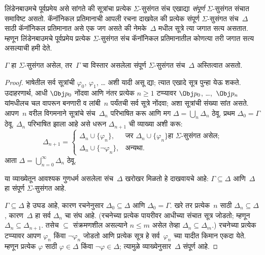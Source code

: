 लिंडेनबाउमचे पूर्वप्रमेय असे सांगते की सूत्रांचा प्रत्येक
$\Sigma$-सुसंगत संच एखाद्या \emph{संपूर्ण} $\Sigma$-सुसंगत
संचात समाविष्ट असतो. कॅनॉनिकल प्रतिमानाची आपली रचना दाखवेल की
प्रत्येक संपूर्ण $\Sigma$-सुसंगत संच~$\Delta$ साठी कॅनॉनिकल
प्रतिमानात असे एक जग असते की नेमके~$\Delta$ मधील
सूत्रे त्या जगात सत्य असतात. म्हणून लिंडेनबाउमचे पूर्वप्रमेय
प्रत्येक $\Sigma$-सुसंगत संच कॅनॉनिकल प्रतिमानातील कोणत्या तरी
जगात सत्य असल्याची हमी देते.

\begin{thm}[लिंडेनबाउमचे पूर्वप्रमेय]\label{nml:com:lin:thm:lindenbaum}
  $\Gamma$ हा $\Sigma$-सुसंगत असेल, तर~$\Gamma$ चा विस्तार असलेला
  संपूर्ण $\Sigma$-सुसंगत संच~$\Delta$ अस्तित्वात असतो.
\end{thm}

\begin{proof}
भाषेतील सर्व सूत्रांची $\varphi_0$, $\varphi_1$, \dots{} अशी यादी असू द्या;
त्यात एखादे सूत्र पुन्हा येऊ शकते. उदाहरणार्थ, आधी
$\Obj p_0$ नोंदवा आणि नंतर प्रत्येक $n \ge 1$ टप्प्यावर
$\Obj p_0$, \dots,~$\Obj p_n$ यांमधीलच चल वापरून
बनणारी व लांबी~$n$ पर्यंतची सर्व सूत्रे नोंदवा;
अशा सूत्रांची संख्या सांत असते. आपण~$n$ वरील विगमनाने
सूत्रांचे संच~$\Delta_n$ परिभाषित करू आणि मग
$\Delta = \bigcup_n \Delta_n$ ठेवू. प्रथम $\Delta_0 = \Gamma$
ठेवू. $\Delta_n$ परिभाषित झाला आहे असे धरून
$\Delta_{n+1}$ ची व्याख्या अशी करू:
\[\Delta_{n+1} =
\begin{cases}
  \Delta_n \cup \{\varphi_n\}, & \text{जर $\Delta_n \cup \{ \varphi_n\}$
    हा $\Sigma$-सुसंगत असेल;} \\
  \Delta_n \cup \{ \lnot \varphi_n\}, & \text{अन्यथा.}
\end{cases}
\]
आता $\Delta = \bigcup_{n=0}^\infty \Delta_n$ ठेवू.

या व्याख्येतून आवश्यक गुणधर्म असलेला संच~$\Delta$
खरोखर मिळतो हे दाखवायचे आहे: $\Gamma \subseteq \Delta$
आणि~$\Delta$ हा संपूर्ण $\Sigma$-सुसंगत आहे.

$\Gamma \subseteq \Delta$ हे उघड आहे, कारण रचनेनुसार
$\Delta_0 \subseteq \Delta$ आणि $\Delta_0 = \Gamma$.
खरे तर प्रत्येक~$n$ साठी $\Delta_n \subseteq \Delta$,
कारण~$\Delta$ हा सर्व $\Delta_n$ चा संघ आहे. (रचनेच्या
प्रत्येक पायरीवर आधीच्या संचात सूत्र जोडतो; म्हणून
$\Delta_n \subseteq \Delta_{n+1}$. तसेच
$\subseteq$ संक्रमणशील असल्याने $n \le m$ असेल तेव्हा
$\Delta_n \subseteq \Delta_{m}$.) रचनेच्या प्रत्येक
टप्प्यावर आपण $\varphi_n$ किंवा $\lnot \varphi_n$ जोडतो आणि
प्रत्येक सूत्र हे सर्व~$\varphi_n$ च्या यादीत किमान
एकदा येते. म्हणून प्रत्येक $\varphi$ साठी $\varphi
\in \Delta$ किंवा $\lnot \varphi \in \Delta$;
त्यामुळे व्याख्येनुसार~$\Delta$ संपूर्ण आहे.


\end{proof}
